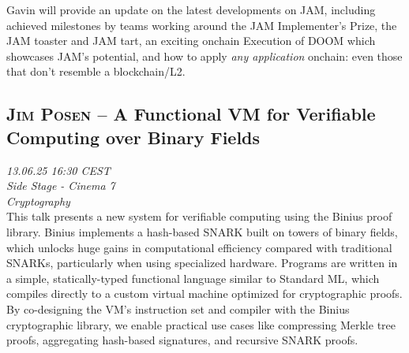 Gavin will provide an update on the latest developments on JAM, including achieved milestones by teams working around the JAM Implementer’s Prize, the JAM toaster and JAM tart, an exciting onchain Execution of DOOM which showcases JAM’s potential, and how to apply \emph{any application} onchain: even those that don't resemble a blockchain/L2.

\clearpage
\subsection {\textsc{Jim Posen}  -- A Functional VM for Verifiable Computing over Binary Fields} \noindent \textit {13.06.25 16:30 CEST\\ Side Stage - Cinema 7\\ Cryptography}\\[1em] This talk presents a new system for verifiable computing using the Binius proof library. Binius implements a hash-based SNARK built on towers of binary fields, which unlocks huge gains in computational efficiency compared with traditional SNARKs, particularly when using specialized hardware. Programs are written in a simple, statically-typed functional language similar to Standard ML, which compiles directly to a custom virtual machine optimized for cryptographic proofs. By co-designing the VM’s instruction set and compiler with the Binius cryptographic library, we enable practical use cases like compressing Merkle tree proofs, aggregating hash-based signatures, and recursive SNARK proofs.

\clearpage
\cleardoublepage


